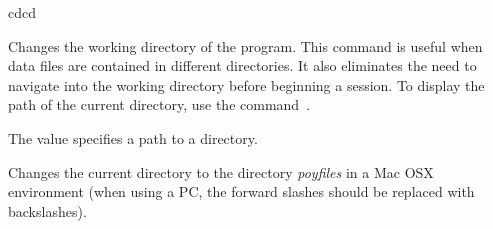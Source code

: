\begin{command}{cd}{cd}

    \syntax{\obligatory{(\poystring)}}

    \begin{poydescription}
        Changes the working directory of the program. This command is useful when
        data files are contained in different directories. It also eliminates the
        need to navigate into the working directory before beginning a \poy session.
        To display the path of the current directory, use the command~.
    \end{poydescription}

    \begin{arguments}
            {The value specifies a path to a directory.}
            {}
    \end{arguments}
    
    \begin{poyexamples}
            {Changes the current directory to the directory \emph{poyfiles} in
            a Mac OSX environment (when using a PC, the forward slashes should
            be replaced with backslashes).}
    \end{poyexamples}

    \begin{poyalso}
    \end{poyalso}

\end{command}



   
